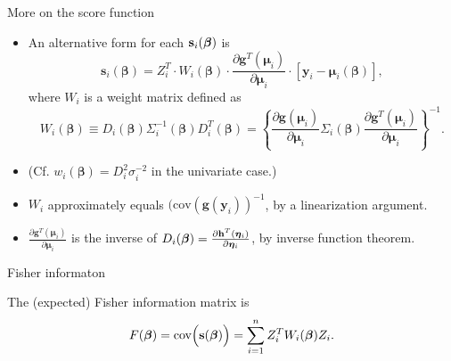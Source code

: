 \documentclass{beamer}
\newcommand{\boldbeta}{{\boldsymbol \beta}}
\newcommand{\boldmu}{{\boldsymbol \mu}}
\newcommand{\boldeta}{{\boldsymbol \eta}}
\newenvironment{wideitemize}%
  {\begin{itemize}%
    \setlength{\parskip}{1em}}%
  {\end{itemize}}
\begin{document}
\begin{frame}{More on the score function}
\begin{wideitemize}

\item
An alternative form for each $\textbf{s}_i(\mbox{\boldmath $\beta$})$ is
\[
\textbf{s}_i(\boldbeta)=Z_i^T \cdot W_i(\boldbeta)\cdot \frac{\partial
\textbf{g}^T(\boldmu_i)}{\partial \boldmu_i}
\cdot [\textbf{y}_i-\boldmu_i(\boldbeta)],
\]
where $W_i$ is a weight matrix defined as
\begin{equation*}
W_i(\boldbeta)\equiv D_i(\boldbeta)\Sigma_i^{-1}(\boldbeta)
D^T_i(\boldbeta)=\left\{\frac{\partial\textbf{g}(\boldmu_i)}{\partial 
\boldmu_i} \Sigma_i(\boldbeta)\frac{\partial
\textbf{g}^T(\boldmu_i)}{\partial \boldmu_i}\right\}^{-1}.
\end{equation*}

\item (Cf.  $w_i (\boldbeta) = D_i^2\sigma_i^{-2} $ in the univariate case.)


\item $W_i$ approximately equals $(\mbox{cov}(\textbf{g}(\textbf{y}_i))^{-1}$, by a linearization argument.

\item $\frac{\partial\textbf{g}^T(\boldmu_i)}{\partial 
\boldmu_i}$ is the inverse of $D_i(\mbox{\boldmath $\beta$}) = \frac{\partial\textbf{h}^T(\boldeta_i)}{\partial \boldeta_i}$, by inverse function theorem.


\end{wideitemize}
\end{frame}

\begin{frame} {Fisher informaton}

The (expected) Fisher information matrix is $$F(\mbox{\boldmath $\beta$})=
\text{cov}\Big(\textbf{s}(\mbox{\boldmath $\beta$})\Big)=\sum_{i=1}^nZ_i^TW_i(\mbox{\boldmath $\beta$})Z_i.$$
\end{frame}
\end{document}
